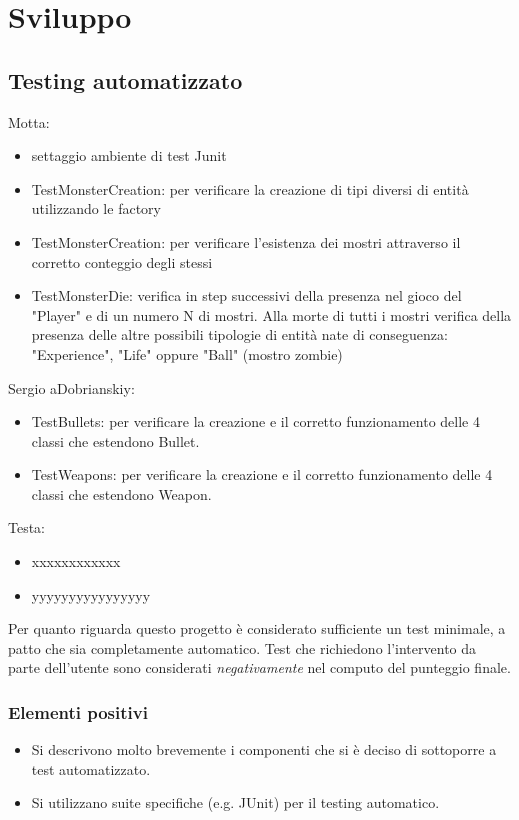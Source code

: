 \documentclass[a4paper,12pt]{report}
\begin{document}
\chapter{Sviluppo}
\section{Testing automatizzato}

Motta:
\begin{itemize}
	\item settaggio ambiente di test Junit
	\item TestMonsterCreation: per verificare la creazione di tipi diversi di entità utilizzando le factory
	\item TestMonsterCreation: per verificare l'esistenza dei mostri attraverso il corretto conteggio degli stessi
	\item TestMonsterDie: verifica in step successivi della presenza nel gioco del "Player" e di un numero N di mostri. Alla morte di tutti i mostri verifica della presenza delle altre possibili tipologie di entità nate di conseguenza: "Experience", "Life" oppure "Ball" (mostro zombie)
\end{itemize}
%
Sergio aDobrianskiy:
\begin{itemize}
	\item TestBullets: per verificare la creazione e il corretto funzionamento delle 4 classi che estendono Bullet.
	\item TestWeapons: per verificare la creazione e il corretto funzionamento delle 4 classi che estendono Weapon.
\end{itemize}
%
Testa:
\begin{itemize}
	\item xxxxxxxxxxxx
	\item yyyyyyyyyyyyyyyy
\end{itemize}
	
Per quanto riguarda questo progetto è considerato sufficiente un test minimale, a patto che sia completamente automatico.
%
Test che richiedono l'intervento da parte dell'utente sono considerati \textit{negativamente} nel computo del punteggio finale.

\subsection*{Elementi positivi}

\begin{itemize}
	\item Si descrivono molto brevemente i componenti che si è deciso di sottoporre a test automatizzato.
	\item Si utilizzano suite specifiche (e.g. JUnit) per il testing automatico.
\end{itemize}
\end{document}

